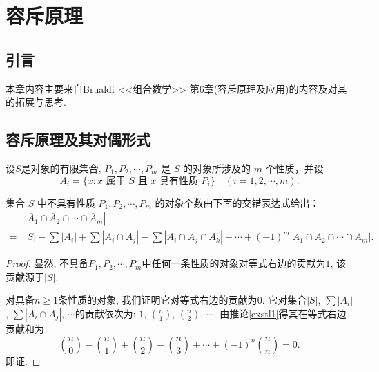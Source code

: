 \chapter{容斥原理}
\section*{引言}
本章内容主要来自Brualdi <<组合数学>> 第6章(容斥原理及应用)的内容及对其的拓展与思考.

\section{容斥原理及其对偶形式}
设$S$是对象的有限集合, $P_1, P_2, \cdots, P_m$ 是 $S$ 的对象所涉及的 $m$ 个性质，并设
\[ A_i = \{ x : x \text{ 属于 } S \text{ 且 } x \text{ 具有性质 } P_i \} \quad (i = 1, 2, \cdots, m). \]

\begin{theorem}[容斥原理的对偶形式]
    集合 $S$ 中不具有性质 $P_1, P_2, \cdots, P_m$ 的对象个数由下面的交错表达式给出：
\begin{align*}
    &|\overline{A}_1 \cap \overline{A}_2 \cap \cdots \cap \overline{A}_m| \\
    =& |S| - \sum |A_i| + \sum |A_i \cap A_j| - \sum |A_i \cap A_j \cap A_k| + \cdots + (-1)^m |A_1 \cap A_2 \cap \cdots \cap A_m|.
\end{align*}
\end{theorem}

\begin{proof}
    显然, 不具备$P_1, P_2, \cdots, P_m$中任何一条性质的对象对等式右边的贡献为$1$, 该贡献源于$|S|$.

    对具备$n\geq 1$条性质的对象, 我们证明它对等式右边的贡献为$0$. 它对集合$|S|$, $\sum |A_i|$, $\sum |A_i \cap A_j|$, $\cdots$的贡献依次为: $1$, $\binom{n}{1}$, $\binom{n}{2}$, $\cdots$. 由推论\ref{exstl1}得其在等式右边贡献和为
    $$\binom{n}{0} - \binom{n}{1} + \binom{n}{2} - \binom{n}{3} + \cdots + (-1)^n \binom{n}{n}=0.$$
    即证.
\end{proof}

